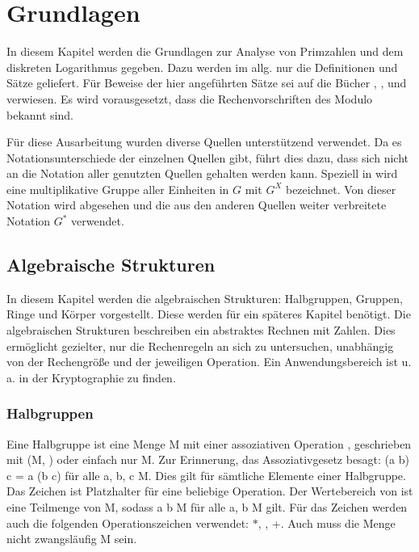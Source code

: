 \section{Grundlagen}\label{Kapitel Grundlagen}
	In diesem Kapitel werden die Grundlagen zur Analyse von Primzahlen und dem diskreten Logarithmus gegeben. Dazu werden im allg. nur die Definitionen und Sätze geliefert. Für Beweise der hier angeführten Sätze sei auf die Bücher \cite{Kryptografie:in:Theorie:und:Praxis}, \cite{Erste:Hilfe:in:Linearer:Algebra}, \cite{Kryptographie:und:IT-Sicherheit} und \cite{Information:und:Kommunikation}
	verwiesen. Es wird vorausgesetzt, dass die Rechenvorschriften des Modulo bekannt sind.
	
	Für diese Ausarbeitung wurden diverse Quellen unterstützend verwendet. Da es Notationsunterschiede der einzelnen Quellen gibt, führt dies dazu, dass sich nicht an die Notation aller genutzten Quellen gehalten werden kann. Speziell in \cite{Erste:Hilfe:in:Linearer:Algebra} wird eine multiplikative Gruppe aller Einheiten in $G$ mit $G^X$ bezeichnet. Von dieser Notation wird abgesehen und die aus den anderen Quellen weiter verbreitete Notation $G^*$ verwendet.
	
	\subsection{Algebraische Strukturen}
		In diesem Kapitel werden die algebraischen Strukturen: Halbgruppen, Gruppen, Ringe und Körper vorgestellt. Diese werden für ein späteres Kapitel benötigt. Die algebraischen Strukturen beschreiben ein abstraktes Rechnen mit Zahlen. Dies ermöglicht gezielter, nur die Rechenregeln an sich zu untersuchen, unabhängig von der Rechengröße und der jeweiligen Operation. Ein Anwendungsbereich ist u. a. in der Kryptographie zu finden.~\cite{Kryptographie:und:Algorithmen}
	
		\subsubsection{Halbgruppen}
			Eine Halbgruppe ist eine Menge M mit einer assoziativen Operation \mycircOhne, geschrieben mit (M, \mycircOhne) oder einfach nur M. Zur Erinnerung, das Assoziativgesetz besagt: (a \mycirc b) \mycirc c = a \mycirc (b \mycirc c) für alle a, b, c \myin M. Dies gilt für sämtliche Elemente einer Halbgruppe. Das Zeichen \mycirc ist Platzhalter für eine beliebige Operation. Der Wertebereich von \mycirc ist eine Teilmenge von M, sodass a \mycirc b \myin M für alle a, b \myin M gilt. Für das Zeichen \mycirc werden auch die folgenden Operationszeichen verwendet: $*$, \mycdotOhne, +. Auch muss die Menge nicht zwangsläufig M sein.~\cite{Erste:Hilfe:in:Linearer:Algebra}
			
